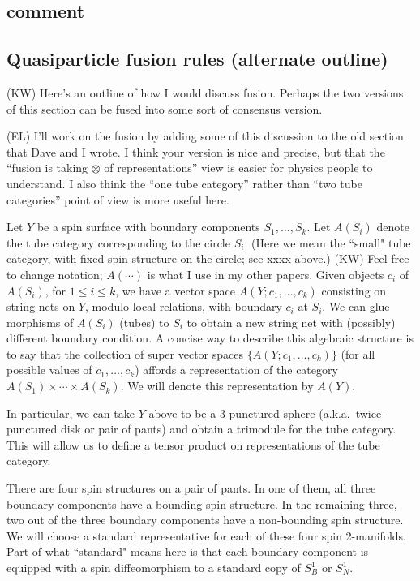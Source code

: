 \documentclass[12pt,a4paper]{article}
\newcommand{\tp}{\otimes}
\newcommand{\kw}[1]{{\color{kwcolor}\footnotesize{(KW) #1}}}
\newcommand{\ethan}[1]{{\color{amethyst}\footnotesize{(EL) #1}}}
\begin{document}
 
\subsection{comment} 
\subsection{Quasiparticle fusion rules (alternate outline)}

\kw{Here's an outline of how I would discuss fusion.
Perhaps the two versions of this section can be fused into some sort of consensus version.}

\ethan{I'll work on the fusion by adding some of this discussion to the old section that Dave and I wrote. I think your version is nice and precise, but that the ``fusion is taking $\tp$ of representations'' view is easier for physics people to understand. I also think the ``one tube category'' rather than ``two tube categories'' point of view is more useful here.}

Let $Y$ be a spin surface with boundary components $S_1,\ldots,S_k$.
Let $A(S_i)$ denote the tube category corresponding to the circle $S_i$.
(Here we mean the ``small" tube category, with fixed spin structure on the circle; see xxxx above.)
\kw{Feel free to change notation; $A(\cdots)$ is what I use in my other papers.}
Given objects $c_i$ of $A(S_i)$, for $1\le i \le k$, we have a vector space $A(Y; c_1,\ldots,c_k)$ consisting on string nets
on $Y$, modulo local relations, with boundary $c_i$ at $S_i$.
We can glue morphisms of $A(S_i)$ (tubes) to $S_i$ to obtain a new string net with (possibly) different boundary condition.
A concise way to describe this algebraic structure is to say that the collection of super vector spaces $\{A(Y; c_1,\ldots,c_k)\}$
(for all possible values of $c_1,\ldots,c_k$)
affords a representation of the category $A(S_1)\times\cdots\times A(S_k)$.
We will denote this representation by $A(Y)$.

In particular, we can take $Y$ above to be a 3-punctured sphere (a.k.a.\ twice-punctured disk or pair of pants)
and obtain a trimodule for the tube category.
This will allow us to define a tensor product on representations of the tube category.

There are four spin structures on a pair of pants.
In one of them, all three boundary components have a bounding spin structure.
In the remaining three, two out of the three boundary components have a non-bounding spin structure.
We will choose a standard representative for each of these four spin 2-manifolds.
Part of what ``standard" means here is that each boundary component is equipped with a spin diffeomorphism to a 
standard copy of $S^1_B$ or $S^1_N$.
\end{document}

